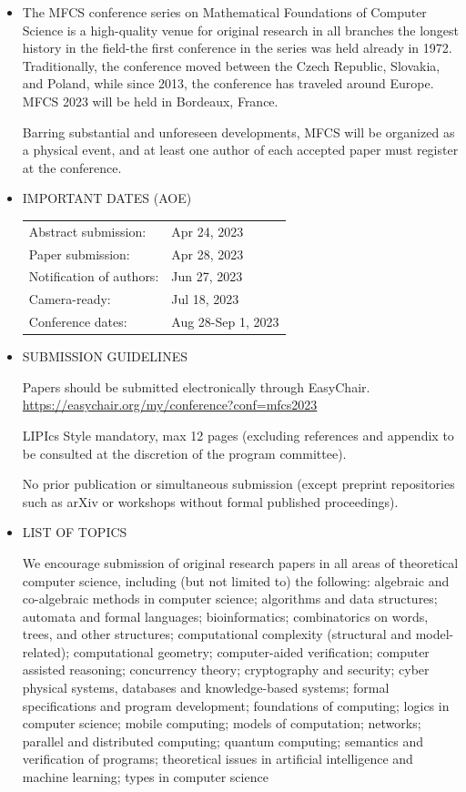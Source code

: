 \documentclass[prodmode,acmtecs]{acmsmall} %
\begin{document}
\begin{itemize}\item  The MFCS conference series on Mathematical Foundations of Computer Science is a high-quality venue for original research in all branches the longest history in the field-the first conference in the series was held already in 1972. Traditionally, the conference moved between the Czech Republic, Slovakia, and Poland, while since 2013, the conference has traveled around Europe. MFCS 2023 will be held in Bordeaux, France. 
 
  Barring substantial and unforeseen developments, MFCS will be organized as a physical event, and at least one author of each accepted paper must register at the conference. 
 
\item  IMPORTANT DATES (AOE) 
 
\begin{tabulary}{\linewidth}{LL}Abstract submission:  & Apr 24, 2023 \\
Paper submission:  & Apr 28, 2023 \\
Notification of authors:  & Jun 27, 2023 \\
Camera-ready:  & Jul 18, 2023 \\
Conference dates:  & Aug 28-Sep 1, 2023 \\
\end{tabulary}
 
\item  SUBMISSION GUIDELINES 
 
  Papers should be submitted electronically through EasyChair. \href{https://easychair.org/my/conference?conf=mfcs2023}{https://easychair.org/my/conference?conf=mfcs2023} 
 
  LIPIcs Style mandatory, max 12 pages (excluding references and appendix to be consulted at the discretion of the program committee). 
 
  No prior publication or simultaneous submission (except preprint repositories such as arXiv or workshops without formal published proceedings). 
 
\item  LIST OF TOPICS 
 
  We encourage submission of original research papers in all areas of theoretical computer science, including (but not limited to) the following: algebraic and co-algebraic methods in computer science; algorithms and data structures; automata and formal languages; bioinformatics; combinatorics on words, trees, and other structures; computational complexity (structural and model-related); computational geometry; computer-aided verification; computer assisted reasoning; concurrency theory; cryptography and security; cyber physical systems, databases and knowledge-based systems; formal specifications and program development; foundations of computing; logics in computer science; mobile computing; models of computation; networks; parallel and distributed computing; quantum computing; semantics and verification of programs; theoretical issues in artificial intelligence and machine learning; types in computer science 
 

\end{itemize}
\end{document}
